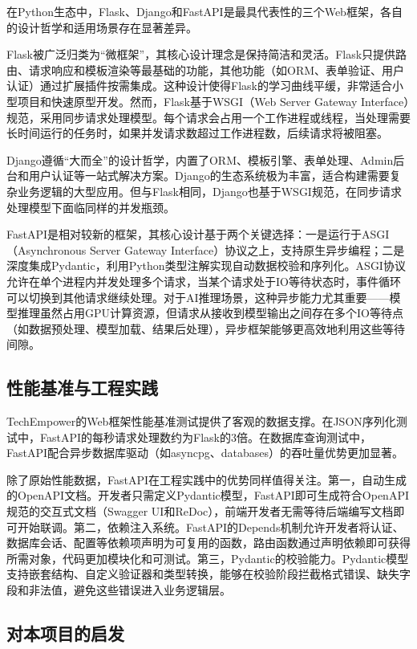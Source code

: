 \documentclass[12pt,a4paper]{ctexart}
\begin{document}
在Python生态中，Flask、Django和FastAPI是最具代表性的三个Web框架，各自的设计哲学和适用场景存在显著差异。

Flask被广泛归类为“微框架”，其核心设计理念是保持简洁和灵活。Flask只提供路由、请求响应和模板渲染等最基础的功能，其他功能（如ORM、表单验证、用户认证）通过扩展插件按需集成。这种设计使得Flask的学习曲线平缓，非常适合小型项目和快速原型开发。然而，Flask基于WSGI（Web Server Gateway Interface）规范，采用同步请求处理模型。每个请求会占用一个工作进程或线程，当处理需要长时间运行的任务时，如果并发请求数超过工作进程数，后续请求将被阻塞。

Django遵循“大而全”的设计哲学，内置了ORM、模板引擎、表单处理、Admin后台和用户认证等一站式解决方案。Django的生态系统极为丰富，适合构建需要复杂业务逻辑的大型应用。但与Flask相同，Django也基于WSGI规范，在同步请求处理模型下面临同样的并发瓶颈。

FastAPI是相对较新的框架，其核心设计基于两个关键选择：一是运行于ASGI（Asynchronous Server Gateway Interface）协议之上，支持原生异步编程；二是深度集成Pydantic，利用Python类型注解实现自动数据校验和序列化。ASGI协议允许在单个进程内并发处理多个请求，当某个请求处于IO等待状态时，事件循环可以切换到其他请求继续处理。对于AI推理场景，这种异步能力尤其重要——模型推理虽然占用GPU计算资源，但请求从接收到模型输出之间存在多个IO等待点（如数据预处理、模型加载、结果后处理），异步框架能够更高效地利用这些等待间隙。

\subsection{性能基准与工程实践}

TechEmpower的Web框架性能基准测试提供了客观的数据支撑。在JSON序列化测试中，FastAPI的每秒请求处理数约为Flask的3倍。在数据库查询测试中，FastAPI配合异步数据库驱动（如asyncpg、databases）的吞吐量优势更加显著。

除了原始性能数据，FastAPI在工程实践中的优势同样值得关注。第一，自动生成的OpenAPI文档。开发者只需定义Pydantic模型，FastAPI即可生成符合OpenAPI规范的交互式文档（Swagger UI和ReDoc），前端开发者无需等待后端编写文档即可开始联调。第二，依赖注入系统。FastAPI的Depends机制允许开发者将认证、数据库会话、配置等依赖项声明为可复用的函数，路由函数通过声明依赖即可获得所需对象，代码更加模块化和可测试。第三，Pydantic的校验能力。Pydantic模型支持嵌套结构、自定义验证器和类型转换，能够在校验阶段拦截格式错误、缺失字段和非法值，避免这些错误进入业务逻辑层。

\subsection{对本项目的启发}
\end{document}
